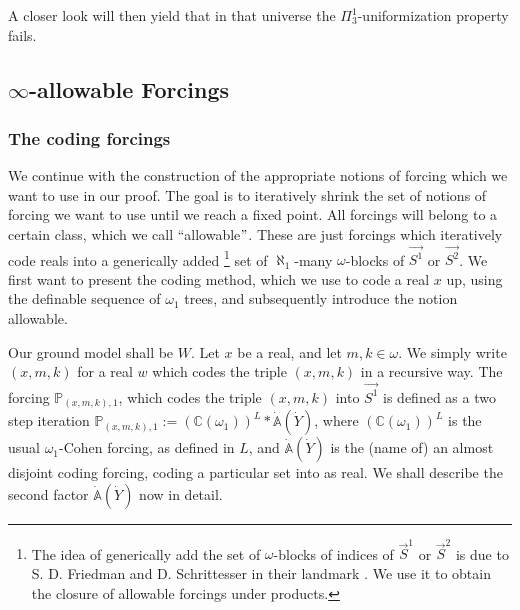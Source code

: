 \documentclass[a4paper,11pt]{article}
\newcommand{\forceP}{\mathbb{P}}
\begin{document}
A closer look will then yield that in that universe the $\Pi^1_3$-uniformization property fails.



\subsection{$\infty$-allowable Forcings}

\subsubsection{The coding forcings}

We continue with the construction of the appropriate notions of forcing which we want to use in our proof. The goal is to iteratively shrink the set of notions of forcing we want to use until we reach a fixed point. All forcings will belong to a certain class, which we call ``allowable$"$. These are just forcings which iteratively code reals into a generically added \footnote{The idea of generically add the set of $\omega$-blocks of indices of $\vec{S}^1$ or $\vec{S}^2$ is due to S. D. Friedman and D. Schrittesser in their landmark \cite{FS}.  We use it to obtain the closure of allowable forcings under products.} set of $\aleph_1$-many $\omega$-blocks of $\vec{S^1}$ or $\vec{S^2}$.
We first want to present the coding method, which we use to code a real $x$ up, using the definable sequence of $\omega_1$ trees, and subsequently introduce the notion allowable.

Our ground model shall be $W$. Let $x$ be a real,  and let $m,k \in \omega$. We simply write $(x,m,k)$ for a real $w$ which codes the triple $(x,m,k)$ in a recursive way. The forcing $\forceP_{(x,m,k),1}$, which codes the triple $(x,m,k)$ into $\vec{S^1}$ is defined as a two step iteration
 $\forceP_{(x,m,k),1} := (\mathbb{C} (\omega_1))^L \ast \dot{\mathbb{A}}(\dot{Y}) $, where $(\mathbb{C} (\omega_1))^L$ is the usual $\omega_1$-Cohen forcing, as defined in $L$, and $\dot{\mathbb{A}} (\dot{Y})$ is the (name of) an almost disjoint coding forcing, coding a particular set into as real. We shall describe the second factor $\dot{\mathbb{A}} (\dot{Y})$ now in detail.
 
\end{document}
